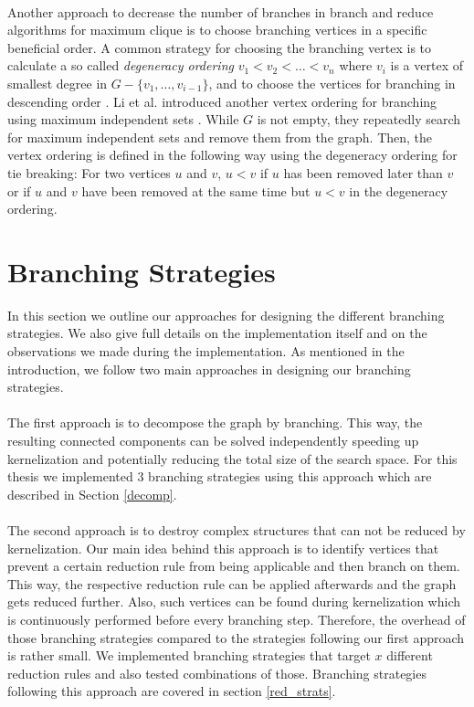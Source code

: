 \documentclass[]{article}
\begin{document}
\paragraph{}
 Another approach to decrease the number of branches in branch and reduce algorithms for maximum clique is to choose branching vertices in a specific beneficial order. A common strategy for choosing the branching vertex is to calculate a so called \textit{degeneracy ordering} $v_1 < v_2 < \dots < v_n$ where $v_i$ is a vertex of smallest degree in $G - \{v_1, \dots, v_{i-1} \}$, and to choose the vertices for branching in descending order \cite{CarraghanPardalos}. Li et al. introduced another vertex ordering for branching using maximum independent sets \cite{LiFangXu}. While $G$ is not empty, they repeatedly search for maximum independent sets and remove them from the graph. Then, the vertex ordering is defined in the following way using the degeneracy ordering for tie breaking: For two vertices $u$ and $v$, $u < v$ if $u$ has been removed later than $v$ or if $u$ and $v$ have been removed at the same time but $u < v$ in the degeneracy ordering. 

\newpage
\section{Branching Strategies} \label{sec4}
In this section we outline our approaches for designing the different branching strategies. We also give full details on the implementation itself and on the observations we made during the implementation. As mentioned in the introduction, we follow two main approaches in designing our branching strategies. 
\paragraph{}
The first approach is to decompose the graph by branching. This way, the resulting connected components can be solved independently speeding up kernelization and potentially reducing the total size of the search space. For this thesis we implemented 3 branching strategies using this approach which are described in Section \ref{decomp}.
\paragraph{}
The second approach is to destroy complex structures that can not be reduced by kernelization. Our main idea behind this approach is to identify vertices that prevent a certain reduction rule from being applicable and then branch on them. This way, the respective reduction rule can be applied afterwards and the graph gets reduced further. Also, such vertices can be found during kernelization which is continuously performed before every branching step. Therefore, the overhead of those branching strategies compared to the strategies following our first approach is rather small. We implemented branching strategies that target $x$ different reduction rules and also tested combinations of those. Branching strategies following this approach are covered in section \ref{red_strats}.
\end{document}
